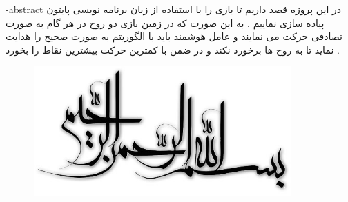 \graphicspath{ {./img} }
\fa-abstract{
در این پروژه قصد داریم تا بازی 
را با استفاده از زبان برنامه نویسی پایتون پیاده سازی نماییم . به این صورت که در زمین بازی دو روح در هر گام به صورت تصادفی حرکت می نمایند و عامل هوشمند باید با الگوریتم 
به صورت صحیح 
را هدایت نماید تا به روح ها برخورد نکند و در ضمن با کمترین حرکت بیشترین نقاط را بخورد .
}


\renewcommand{\bibname}{مراجع}



\AUTtitle
\vspace*{7cm}
\thispagestyle{empty}
\begin{center}
\includegraphics[height=5cm,width=12cm]{besm}
\end{center}